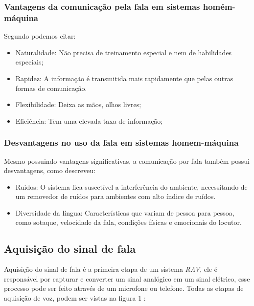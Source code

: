 \subsubsection{Vantagens da comunicação pela fala em sistemas homém-máquina}

Segundo  podemos citar:

\begin{itemize}
\item Naturalidade: Não precisa de treinamento especial e nem de habilidades especiais;
\item Rapidez: A informação é transmitida mais rapidamente que pelas outras formas de comunicação.
\item Flexibilidade: Deixa as mãos, olhos livres;
\item Eficiência: Tem uma elevada taxa de informação;
\end{itemize}

\subsubsection{Desvantagens no uso da fala em sistemas homem-máquina}
Mesmo possuindo vantagens significativas, a comunicação por fala também possui desvantagens, como  descreveu:

\begin{itemize}
\item Ruidos: O sistema fica suscetível a interferência do ambiente, necessitando de um removedor de ruídos para ambientes com alto índice de ruídos.
\item Diversidade da língua: Características que variam de pessoa para pessoa, como sotaque, velocidade da fala, condições físicas e emocionais do locutor. 
\end{itemize}

\subsection{Aquisição do sinal de fala}
Aquisição do sinal de fala é a primeira etapa de um sistema \textit{RAV}, ele é responsável por capturar e converter um sinal analógico em um sinal elétrico, esse processo pode ser feito através de um microfone ou telefone. Todas as etapas de aquisição de voz, podem ser vistas na figura 1 \cite{RavIsolAnderson}:

